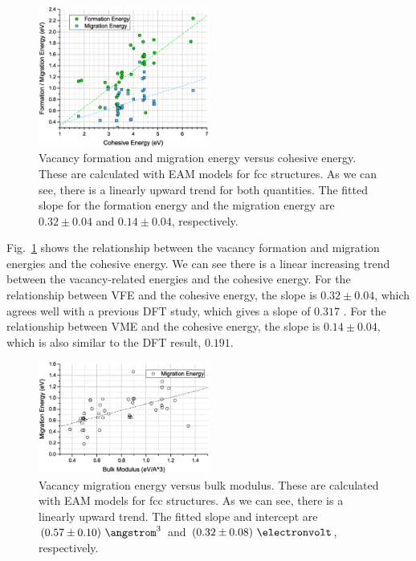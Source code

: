 \documentclass[%
 reprint,
 nofootinbib,
 amsmath,amssymb,
 aps,
]{revtex4-1}
\begin{document}
\begin{figure}
\centering
\includegraphics[width=0.5\textwidth, clip, trim = 10mm 10mm 10mm 10mm]{vfevme_vs_coh}%
\caption{\label{fig:vfevmevscoh}
Vacancy formation and migration energy versus cohesive energy.
These are calculated with EAM models for fcc structures.
As we can see, there is a linearly upward trend for both quantities.
The fitted slope for the formation energy and the migration energy are $0.32\pm0.04$ and $0.14\pm0.04$, respectively.
}
\end{figure}

Fig.~\ref{fig:vfevmevscoh} shows the relationship between the vacancy formation and migration energies and the cohesive energy.
We can see there is a linear increasing trend between the vacancy-related energies and the cohesive energy.
For the relationship between VFE and the cohesive energy, the slope is $0.32\pm0.04$, which agrees well with a previous DFT study, which gives a slope of $0.317$ \cite{angsten2014elemental}.
For the relationship between VME and the cohesive energy, the slope is $0.14\pm0.04$, which is also similar to the DFT result, $0.191$.

\begin{figure}
\centering
\includegraphics[width=0.5\textwidth, clip, trim = 10mm 3mm 10mm 10mm]{vme_vs_bulk}%
\caption{\label{fig:vmevsbulk}
Vacancy migration energy versus bulk modulus.
These are calculated with EAM models for fcc structures.
As we can see, there is a linearly upward trend.
The fitted slope and intercept are $(0.57\pm0.10)~\angstrom^3$ and $(0.32\pm0.08)~\electronvolt$, respectively.
}
\end{figure}
\end{document}
